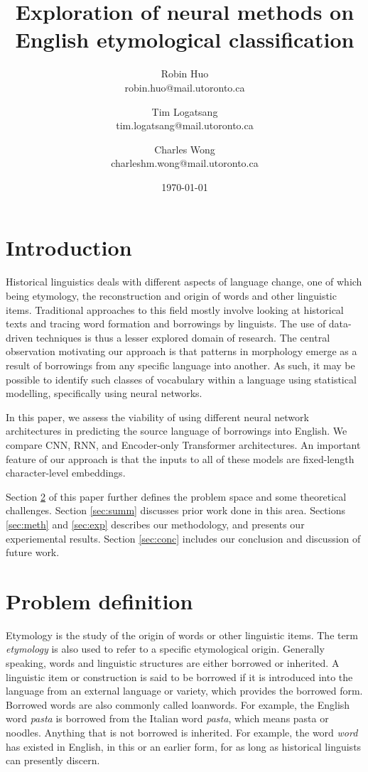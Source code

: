 \documentclass[11pt]{article}
\title{\vspace{-3cm}Exploration of neural methods on English etymological classification}
\date{\today}
\author{Robin Huo \\ robin.huo@mail.utoronto.ca
\and Tim Logatsang \\ tim.logatsang@mail.utoronto.ca
\and Charles Wong \\ charleshm.wong@mail.utoronto.ca}
\begin{document}
	\maketitle
	
	\section{Introduction}
	
	Historical linguistics deals with different aspects of language change, one of which being etymology, the reconstruction and origin of words and other linguistic items. Traditional approaches to this field mostly involve looking at historical texts and tracing word formation and borrowings by linguists. The use of data-driven techniques is thus a lesser explored domain of research. The central observation motivating our approach is that patterns in morphology emerge as a result of borrowings from any specific language into another. As such, it may be possible to identify such classes of vocabulary within a language using statistical modelling, specifically using neural networks.
	
	In this paper, we assess the viability of using different neural network architectures in predicting the source language of borrowings into English. We compare CNN, RNN, and Encoder-only Transformer architectures. An important feature of our approach is that the inputs to all of these models are fixed-length character-level embeddings.
	
	Section \ref{sec:prob} of this paper further defines the problem space and some theoretical challenges. Section \ref{sec:summ} discusses prior work done in this area. Sections \ref{sec:meth} and \ref{sec:exp} describes our methodology, and presents our experiemental results. Section \ref{sec:conc} includes our conclusion and discussion of future work.
	
	\section{Problem definition} \label{sec:prob}        %
	Etymology is the study of the origin of words or other linguistic items.
	The term \textit{etymology} is also used to refer to a specific etymological origin.
	Generally speaking, words and linguistic structures are either borrowed or inherited.
	A linguistic item or construction is said to be borrowed if it is introduced into the language from an external language or variety, which provides the borrowed form.
	Borrowed words are also commonly called loanwords.
	For example, the English word \textit{pasta} is borrowed from the Italian word \textit{pasta}, which means pasta or noodles.
	Anything that is not borrowed is inherited.
	For example, the word \textit{word} has existed in English, in this or an earlier form, for as long as historical linguists can presently discern.
	
\end{document}

